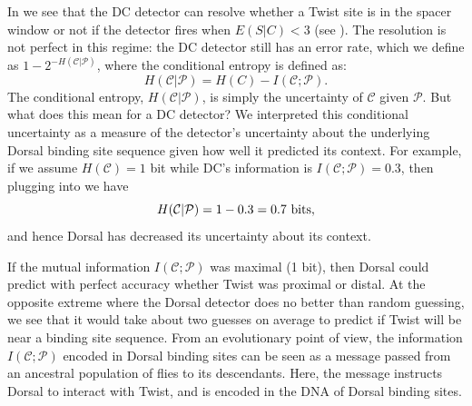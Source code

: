 In  we see that the DC detector can resolve whether a Twist site is in the spacer window or not if the detector fires when $E(S|C) < 3$ (see ). The resolution is not perfect in this regime: the DC detector still has an error rate, which we define as $1-2^{-H(\mathcal C| \mathcal P)}$, where the conditional entropy is defined as:
\begin{equation}\label{conduncer}
H(\mathcal C| \mathcal P)=H(C)-I(\mathcal C; \mathcal P).
\end{equation}
The conditional entropy, $H(\mathcal C| \mathcal P)$, is simply the uncertainty of $\mathcal C$ given $\mathcal P$.  But what does this mean for a DC detector?  We interpreted this conditional uncertainty as a measure of the detector's uncertainty about the underlying Dorsal binding site sequence given how well it predicted its context.  For example, if we assume $H(\mathcal C)=1$ bit while DC's information is $I(\mathcal C; \mathcal P)=0.3$, then plugging into  we have
\begin{equation}
H(\mathcal C| \mathcal P)=1-0.3 = 0.7\ {\rm bits},
\end{equation}
and hence Dorsal has decreased its uncertainty about its context.  

If the mutual information $I(\mathcal C; \mathcal P)$ was maximal (1 bit), then Dorsal could predict with perfect accuracy whether Twist was proximal or distal.  At the opposite extreme where the Dorsal detector does no better than random guessing, we see that it would take about two guesses on average to predict if Twist will be near a binding site sequence.  From an evolutionary point of view, the information $I(\mathcal C; \mathcal P)$ encoded in Dorsal binding sites can be seen as a message passed from an ancestral population of flies to its descendants.  Here, the message instructs Dorsal to interact with Twist, and is encoded in the DNA of Dorsal binding sites. 



